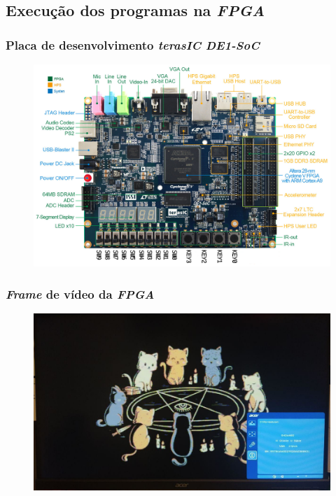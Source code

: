 \documentclass[aspectratio=169]{beamer}
\begin{document}
    \subsection{Execução dos programas na \textit{FPGA}}
    \begin{frame}
        \frametitle{Placa de desenvolvimento \textit{terasIC DE1-SoC}}
        \vfill
        \begin{figure}[H]
        \centering
            \includegraphics[width=.9\textwidth,height=.85\textheight,keepaspectratio]{../images/fpga/de1_soc_subs.png}
        \end{figure}
        \vfill
    \end{frame}

    \begin{frame}
        \frametitle{\textit{Frame} de vídeo da \textit{FPGA}}
        \vfill
        \begin{figure}[H]
        \centering
            \includegraphics[width=.9\textwidth,height=.85\textheight,keepaspectratio]{../images/osd/display.jpg}
        \end{figure}
        \vfill
    \end{frame}
\end{document}
